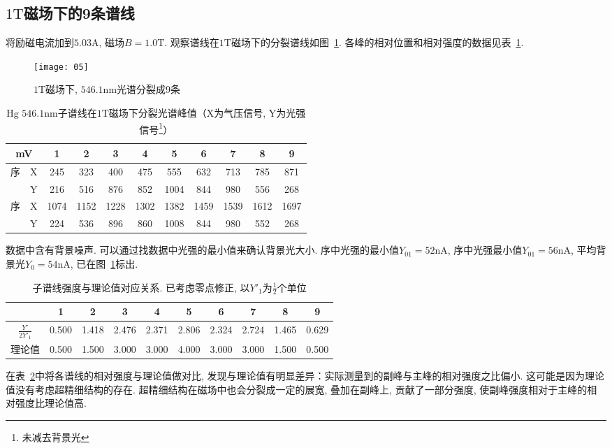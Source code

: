 \documentclass[aps,pre,12pt,preprint,onecolumn,showpacs,showkeys]{revtex4-1}
\begin{document}
\subsection{$1\mathrm T$磁场下的9条谱线}
将励磁电流加到$5.03\mathrm{A}$, 磁场$B=1.0\mathrm{T}$. 观察谱线在$1\mathrm{T}$磁场下的分裂谱线如图~\ref{fig:fig1}. 各峰的相对位置和相对强度的数据见表~\ref{tab:table2}. 
\begin{figure}[h]
\centering
\texttt{[image: 05]}
\caption{\label{fig:fig1}%
$1\mathrm T$磁场下, $546.1 \mathrm{nm}$光谱分裂成9条}
\end{figure}
\begin{table}[h]
\caption{\label{tab:table2}%
$\mathrm{Hg}$ $546.1 \mathrm{nm}$子谱线在$1\mathrm{T}$磁场下分裂光谱峰值（X为气压信号, Y为光强信号\footnote{未减去背景光}）}
\begin{tabular}{|c|c|c|c|c|c|c|c|c|c|c|}
\hline
\multicolumn{2}{|c|}{mV}&1&2&3&4&5&6&7&8&9\\\hline
\multirow{2}{*}{\uppercase{\romannumeral 1}序}&X&245&323&400&475&555&632&713&785&871\\
\cline{2-11}&Y&216&516&876&852&1004&844&980&556&268\\\hline
\multirow{2}{*}{\uppercase{\romannumeral 2}序}&X&1074&1152&1228&1302&1382&1459&1539&1612&1697\\
\cline{2-11}&Y&224&536&896&860&1008&844&980&552&268\\\hline
\end{tabular}
\end{table}

数据中含有背景噪声. 可以通过找数据中光强的最小值来确认背景光大小. \uppercase{}序中光强的最小值$Y_{01}=52\mathrm{nA}$, \uppercase{}序中光强最小值$Y_{01}=56\mathrm{nA}$, 平均背景光$Y_0=54\mathrm{nA}$, 已在图~\ref{fig:fig1}标出. 

\begin{table}[h]
\caption{\label{tab:table3}%
子谱线强度与理论值对应关系. 已考虑零点修正, 以$Y'_1$为$\frac{1}{2}$个单位}
\begin{tabular}{|c|c|c|c|c|c|c|c|c|c|}
\hline
&1&2&3&4&5&6&7&8&9\\\hline
$\frac{Y'}{2Y'_1}$&0.500&1.418&2.476&2.371&2.806&2.324&2.724&1.465&0.629\\\hline
理论值&0.500&1.500&3.000&3.000&4.000&3.000&3.000&1.500&0.500\\\hline
\end{tabular}
\end{table}

在表~\ref{tab:table3}中将各谱线的相对强度与理论值做对比, 发现与理论值有明显差异：实际测量到的副峰与主峰的相对强度之比偏小. 这可能是因为理论值没有考虑超精细结构的存在. 超精细结构在磁场中也会分裂成一定的展宽, 叠加在副峰上, 贡献了一部分强度, 使副峰强度相对于主峰的相对强度比理论值高. 
\end{document}
